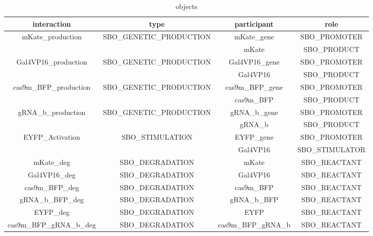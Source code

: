 \begin{table}[tb!]
\centering
\caption{ objects}
\label{tbl:tbl-Interaction}
\begin{tabular}{c@{\hspace{1.5em}}c@{\hspace{1.5em}}c@{\hspace{1.5em}}c@{\hspace{1.5em}}}
\hline
interaction&
type&
participant&
role\\
\hline
\multirow{2}{*}{mKate\_production}&\multirow{2}{*}{SBO\_GENETIC\_PRODUCTION}&mKate\_gene&SBO\_PROMOTER\\
  &&mKate&SBO\_PRODUCT\\ \hline %
\multirow{2}{*}{Gal4VP16\_production}&\multirow{2}{*}{SBO\_GENETIC\_PRODUCTION}&Gal4VP16\_gene&SBO\_PROMOTER\\
  &&Gal4VP16&SBO\_PRODUCT\\ \hline %
\multirow{2}{*}{cas9m\_BFP\_production}&\multirow{2}{*}{SBO\_GENETIC\_PRODUCTION}&cas9m\_BFP\_gene&SBO\_PROMOTER\\
  &&cas9m\_BFP&SBO\_PRODUCT\\ \hline %
\multirow{2}{*}{gRNA\_b\_production}&\multirow{2}{*}{SBO\_GENETIC\_PRODUCTION}&gRNA\_b\_gene&SBO\_PROMOTER\\
  &&gRNA\_b&SBO\_PRODUCT\\ \hline %
\multirow{2}{*}{EYFP\_Activation}&\multirow{2}{*}{SBO\_STIMULATION}&EYFP\_gene&SBO\_PROMOTER\\
  &&Gal4VP16&SBO\_STIMULATOR\\ \hline %
mKate\_deg&SBO\_DEGRADATION&mKate&SBO\_REACTANT\\ \hline%
Gal4VP16\_deg&SBO\_DEGRADATION&Gal4VP16&SBO\_REACTANT\\ \hline%
cas9m\_BFP\_deg&SBO\_DEGRADATION&cas9m\_BFP&SBO\_REACTANT\\ \hline%
gRNA\_b\_BFP\_deg&SBO\_DEGRADATION&gRNA\_b\_BFP&SBO\_REACTANT\\ \hline%
EYFP\_deg&SBO\_DEGRADATION&EYFP&SBO\_REACTANT\\ \hline%
cas9m\_BFP\_gRNA\_b\_deg&SBO\_DEGRADATION&cas9m\_BFP\_gRNA\_b&SBO\_REACTANT\\ \hline%
\end{tabular}
\end{table}

